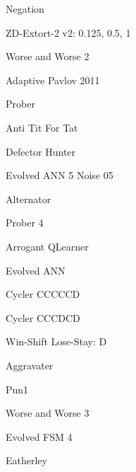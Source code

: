 \item Negation
\item ZD-Extort-2 v2: 0.125, 0.5, 1
\item Worse and Worse 2
\item Adaptive Pavlov 2011
\item Prober
\item Anti Tit For Tat
\item Defector Hunter
\item Evolved ANN 5 Noise 05
\item Alternator
\item Prober 4
\item Arrogant QLearner
\item Evolved ANN
\item Cycler CCCCCD
\item Cycler CCCDCD
\item Win-Shift Lose-Stay: D
\item Aggravater
\item Pun1
\item Worse and Worse 3
\item Evolved FSM 4
\item Eatherley
